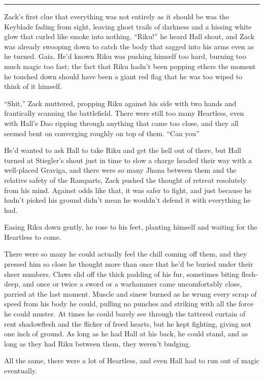\fancybreak{\pfbreakdisplay}


Zack's first clue that everything was not entirely as it should be was the Keyblade fading from sight, leaving ghost trails of darkness and a hissing white glow that curled like smoke into nothing. ``Riku!'' he heard Hall shout, and Zack was already swooping down to catch the body that sagged into his arms even as he turned. Gaia. He'd known Riku was pushing himself too hard, burning too much magic too fast; the fact that Riku hadn't been popping ethers the moment he touched down should have been a giant red flag that he was too wiped to think of it himself.

``Shit,'' Zack muttered, propping Riku against his side with two hands and frantically scanning the battlefield. There were still too many Heartless, even with Hall's Dao ripping through anything that came too close, and they all seemed bent on converging roughly on top of them. ``Can you\textemdash ''

He'd wanted to ask Hall to take Riku and get the hell out of there, but Hall turned at Stiegler's shout just in time to slow a charge headed their way with a well-placed Graviga, and there were so many Jhana between them and the relative safety of the Ramparts, Zack pushed the thought of retreat resolutely from his mind. Against odds like that, it was safer to fight, and just because he hadn't picked his ground didn't mean he wouldn't defend it with everything he had.

Easing Riku down gently, he rose to his feet, planting himself and waiting for the Heartless to come.

There were so many he could actually feel the chill coming off them, and they pressed him so close he thought more than once that he'd be buried under their sheer numbers. Claws slid off the thick padding of his fur, sometimes biting flesh-deep, and once or twice a sword or a warhammer came uncomfortably close, parried at the last moment. Muscle and sinew burned as he wrung every scrap of speed from his body he could, pulling no punches and striking with all the force he could muster. At times he could barely see through the tattered curtain of rent shadowflesh and the flicker of freed hearts, but he kept fighting, giving not one inch of ground. As long as he had Hall at his back, he could stand, and as long as they had Riku between them, they weren't budging.

All the same, there were a lot of Heartless, and even Hall had to run out of magic eventually.

